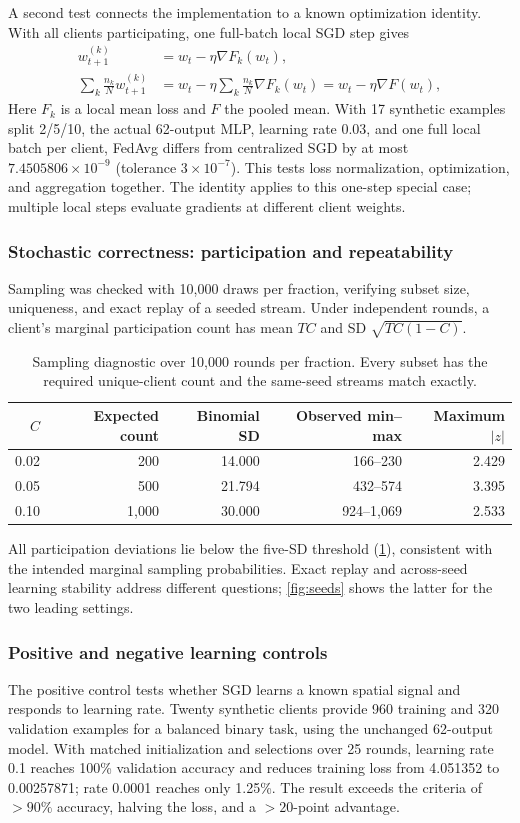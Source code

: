 A second test connects the implementation to a known optimization identity. With all clients participating, one full-batch local SGD step gives
\begin{align}
w_{t+1}^{(k)}&=w_t-\eta\nabla F_k(w_t),\nonumber\\
\sum_k\frac{n_k}{N}w_{t+1}^{(k)}
&=w_t-\eta\sum_k\frac{n_k}{N}\nabla F_k(w_t)
=w_t-\eta\nabla F(w_t),\label{eq:sgdidentity}
\end{align}
Here $F_k$ is a local mean loss and $F$ the pooled mean. With 17 synthetic examples split 2/5/10, the actual 62-output MLP, learning rate 0.03, and one full local batch per client, FedAvg differs from centralized SGD by at most $7.4505806\times10^{-9}$ (tolerance $3\times10^{-7}$). This tests loss normalization, optimization, and aggregation together. The identity applies to this one-step special case; multiple local steps evaluate gradients at different client weights.

\subsubsection{Stochastic correctness: participation and repeatability}
Sampling was checked with 10,000 draws per fraction, verifying subset size, uniqueness, and exact replay of a seeded stream. Under independent rounds, a client's marginal participation count has mean $TC$ and SD $\sqrt{TC(1-C)}$.
\begin{table}[htbp]
\centering
\caption{Sampling diagnostic over 10,000 rounds per fraction. Every subset has the required unique-client count and the same-seed streams match exactly.}\label{tab:sampling}
\begin{tabular}{rrrrr}
\toprule
$C$ & Expected count & Binomial SD & Observed min--max & Maximum $|z|$\\
\midrule
0.02 & 200 & 14.000 & 166--230 & 2.429\\
0.05 & 500 & 21.794 & 432--574 & 3.395\\
0.10 & 1,000 & 30.000 & 924--1,069 & 2.533\\
\bottomrule
\end{tabular}
\end{table}
All participation deviations lie below the five-SD threshold (\cref{tab:sampling}), consistent with the intended marginal sampling probabilities. Exact replay and across-seed learning stability address different questions; \cref{fig:seeds} shows the latter for the two leading settings.

\subsubsection{Positive and negative learning controls}
The positive control tests whether SGD learns a known spatial signal and responds to learning rate. Twenty synthetic clients provide 960 training and 320 validation examples for a balanced binary task, using the unchanged 62-output model. With matched initialization and selections over 25 rounds, learning rate 0.1 reaches 100\% validation accuracy and reduces training loss from 4.051352 to 0.00257871; rate 0.0001 reaches only 1.25\%. The result exceeds the criteria of $>90\%$ accuracy, halving the loss, and a $>20$-point advantage.

